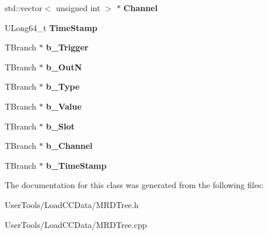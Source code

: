 \begin{DoxyCompactItemize}
\item 
\hypertarget{classMRDTree_a4275330c81a0e7d017c473e88275dbc7}{
std::vector$<$ unsigned int $>$ $\ast$ {\bfseries Channel}}
\label{classMRDTree_a4275330c81a0e7d017c473e88275dbc7}

\item 
\hypertarget{classMRDTree_abee67bfdf0a6eaf117b85b9b2485612b}{
ULong64\_\-t {\bfseries TimeStamp}}
\label{classMRDTree_abee67bfdf0a6eaf117b85b9b2485612b}

\item 
\hypertarget{classMRDTree_a555f128842c285877adad7754222feb4}{
TBranch $\ast$ {\bfseries b\_\-Trigger}}
\label{classMRDTree_a555f128842c285877adad7754222feb4}

\item 
\hypertarget{classMRDTree_abee621e9208bdfcbdb2c2f068e74950d}{
TBranch $\ast$ {\bfseries b\_\-OutN}}
\label{classMRDTree_abee621e9208bdfcbdb2c2f068e74950d}

\item 
\hypertarget{classMRDTree_ae95ac23e8ade856062ca8646cf8b652e}{
TBranch $\ast$ {\bfseries b\_\-Type}}
\label{classMRDTree_ae95ac23e8ade856062ca8646cf8b652e}

\item 
\hypertarget{classMRDTree_ab5ec56917aad8639be559941dbbbf5f1}{
TBranch $\ast$ {\bfseries b\_\-Value}}
\label{classMRDTree_ab5ec56917aad8639be559941dbbbf5f1}

\item 
\hypertarget{classMRDTree_a7e22be6df66f4f8da01a836c6ba21251}{
TBranch $\ast$ {\bfseries b\_\-Slot}}
\label{classMRDTree_a7e22be6df66f4f8da01a836c6ba21251}

\item 
\hypertarget{classMRDTree_a3bb90cc6b5552840b91dfb88ce24d19e}{
TBranch $\ast$ {\bfseries b\_\-Channel}}
\label{classMRDTree_a3bb90cc6b5552840b91dfb88ce24d19e}

\item 
\hypertarget{classMRDTree_acc8785e5ee2f2702f240bfc1f629decc}{
TBranch $\ast$ {\bfseries b\_\-TimeStamp}}
\label{classMRDTree_acc8785e5ee2f2702f240bfc1f629decc}

\end{DoxyCompactItemize}


The documentation for this class was generated from the following files:\begin{DoxyCompactItemize}
\item 
UserTools/LoadCCData/MRDTree.h\item 
UserTools/LoadCCData/MRDTree.cpp\end{DoxyCompactItemize}
